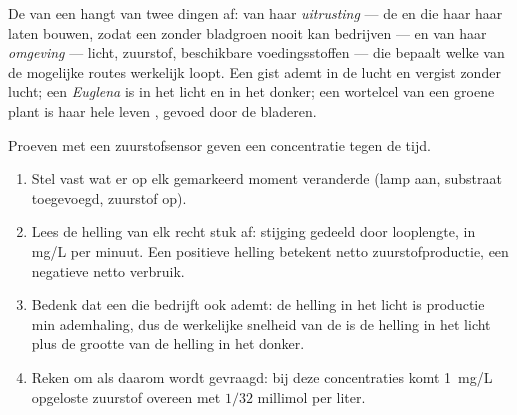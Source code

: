 \begin{proposition}\label{prop:g10:cell-metabolism:decides}
De  van een  hangt van twee dingen af: van haar
\emph{uitrusting} --- de  en  die haar  haar laten
bouwen, zodat een  zonder bladgroen nooit  kan bedrijven
--- en van haar \emph{omgeving} --- licht, zuurstof, beschikbare
voedingsstoffen --- die bepaalt welke van de mogelijke routes werkelijk
loopt. Een gist ademt in de lucht en vergist zonder lucht; een
\emph{Euglena} is  in het licht en  in het donker;
een wortelcel van een groene plant is haar hele leven ,
gevoed door de bladeren.
\end{proposition}
\admitted

\begin{method}\label{met:g10:cell-metabolism:trace}
Proeven met een zuurstofsensor geven een concentratie tegen de tijd.
\begin{enumerate}
  \item Stel vast wat er op elk gemarkeerd moment veranderde (lamp aan,
        substraat toegevoegd, zuurstof op).
  \item Lees de helling van elk recht stuk af: stijging gedeeld door
        looplengte, in \unit{mg/L} per minuut. Een positieve helling
        betekent netto zuurstofproductie, een negatieve netto verbruik.
  \item Bedenk dat een  die  bedrijft ook ademt: de
        helling in het licht is productie min ademhaling, dus de
        werkelijke snelheid van de  is de helling in het
        licht plus de grootte van de helling in het donker.
  \item Reken om als daarom wordt gevraagd: bij deze concentraties komt
        \qty{1}{mg/L} opgeloste zuurstof overeen met $1/32$ millimol
        per liter.
\end{enumerate}
\end{method}

